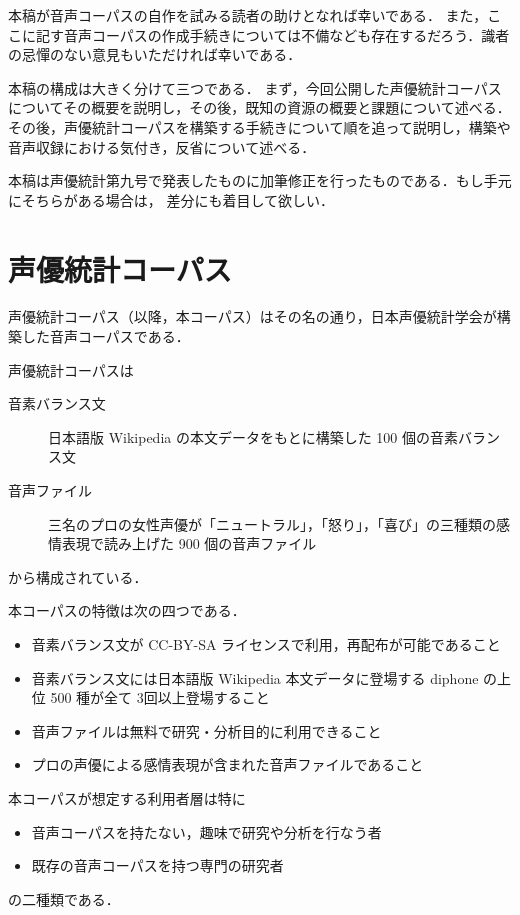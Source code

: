 \documentclass[final,10pt,twocolumn,3p,times,fleqn]{elsarticle}
\begin{document}
 本稿が音声コーパスの自作を試みる読者の助けとなれば幸いである．
 また，ここに記す音声コーパスの作成手続きについては不備なども存在するだろう．識者の忌憚のない意見もいただければ幸いである．
 
 本稿の構成は大きく分けて三つである．
 まず，今回公開した声優統計コーパスについてその概要を説明し，その後，既知の資源の概要と課題について述べる．
 その後，声優統計コーパスを構築する手続きについて順を追って説明し，構築や音声収録における気付き，反省について述べる．

 本稿は声優統計第九号で発表したもの\cite{vol9}に加筆修正を行ったものである．もし手元にそちらがある場合は，
 差分にも着目して欲しい．

 \section{声優統計コーパス}
 声優統計コーパス（以降，本コーパス）はその名の通り，日本声優統計学会が構築した音声コーパスである．

 声優統計コーパスは
 \begin{description}
  \item[音素バランス文] 日本語版 Wikipedia の本文データをもとに構築した 100 個の音素バランス文
  \item[音声ファイル] 三名のプロの女性声優が「ニュートラル」，「怒り」，「喜び」の三種類の感情表現で読み上げた 900 個の音声ファイル
 \end{description}
 から構成されている．

 本コーパスの特徴は次の四つである．
 \begin{itemize}
  \item 音素バランス文が CC-BY-SA ライセンスで利用，再配布が可能であること
  \item 音素バランス文には日本語版 Wikipedia 本文データに登場する diphone の上位 500 種が全て 3回以上登場すること
  \item 音声ファイルは無料で研究・分析目的に利用できること
  \item プロの声優による感情表現が含まれた音声ファイルであること
 \end{itemize}

 本コーパスが想定する利用者層は特に
 \begin{itemize}
  \item 音声コーパスを持たない，趣味で研究や分析を行なう者
  \item 既存の音声コーパスを持つ専門の研究者
 \end{itemize}
 の二種類である．
\end{document}
